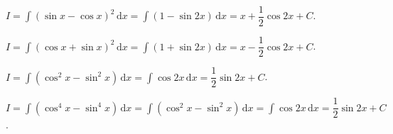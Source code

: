 \begin{vd}
{\begin{listEX}[1]
            \item $I=\displaystyle\int (\sin x-\cos x)^2 \mathrm{\,d}x=\displaystyle\int (1-\sin 2x)\mathrm{\,d}x=x+\dfrac{1}{2}\cos 2x+C$.
            \item $I=\displaystyle\int (\cos x+\sin x)^2 \mathrm{\,d}x=\displaystyle\int(1+\sin 2x)\mathrm{\,d}x=x-\dfrac{1}{2}\cos 2x+C$.
            \item $I=\displaystyle\int \left(\cos ^2x-\sin ^2x\right) \mathrm{\,d}x= \displaystyle\int \cos 2x \mathrm{\,d}x=\dfrac{1}{2}\sin 2x+C$.
            \item $I=\displaystyle\int \left(\cos ^{4}x-\sin ^{4}x\right) \mathrm{\,d}x=\displaystyle\int \left(\cos ^2x-\sin ^2x\right) \mathrm{\,d}x= \displaystyle\int \cos 2x \mathrm{\,d}x=\dfrac{1}{2}\sin 2x+C$.
        \end{listEX}
    }
\end{vd}

